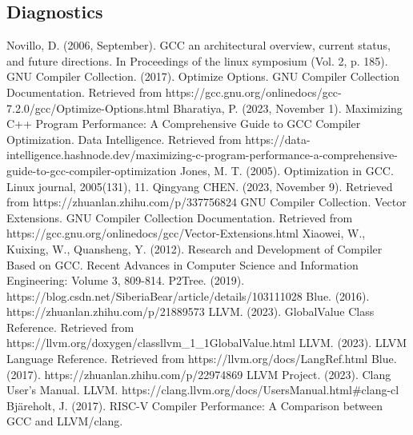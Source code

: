 \documentclass[conference]{IEEEtran}
\begin{document}
\subsection{Diagnostics}



\begin{thebibliography}{00}

	 Novillo, D. (2006, September). GCC an architectural overview, current status, and future directions. In Proceedings of the linux symposium (Vol. 2, p. 185).
	 GNU Compiler Collection. (2017). Optimize Options. GNU Compiler Collection Documentation. Retrieved from https://gcc.gnu.org/onlinedocs/gcc-7.2.0/gcc/Optimize-Options.html
	 Bharatiya, P. (2023, November 1). Maximizing C++ Program Performance: A Comprehensive Guide to GCC Compiler Optimization. Data Intelligence. Retrieved from https://data-intelligence.hashnode.dev/maximizing-c-program-performance-a-comprehensive-guide-to-gcc-compiler-optimization
	 Jones, M. T. (2005). Optimization in GCC. Linux journal, 2005(131), 11.
	 Qingyang CHEN. (2023, November 9). Retrieved from https://zhuanlan.zhihu.com/p/337756824
	 GNU Compiler Collection. Vector Extensions. GNU Compiler Collection Documentation. Retrieved from https://gcc.gnu.org/onlinedocs/gcc/Vector-Extensions.html
	 Xiaowei, W., Kuixing, W., Quansheng, Y. (2012). Research and Development of Compiler Based on GCC. Recent Advances in Computer Science and Information Engineering: Volume 3, 809-814.
	 P2Tree. (2019). https://blog.csdn.net/SiberiaBear/article/details/103111028
	 Blue. (2016). https://zhuanlan.zhihu.com/p/21889573
	 LLVM. (2023). GlobalValue Class Reference. Retrieved from https://llvm.org/doxygen/classllvm\_1\_1GlobalValue.html
	 LLVM. (2023). LLVM Language Reference. Retrieved from https://llvm.org/docs/LangRef.html
	 Blue. (2017). https://zhuanlan.zhihu.com/p/22974869
	 LLVM Project. (2023). Clang User's Manual. LLVM. https://clang.llvm.org/docs/UsersManual.html\#clang-cl
	 Bjäreholt, J. (2017). RISC-V Compiler Performance: A Comparison between GCC and LLVM/clang.


\end{thebibliography}

\vspace{12pt}
\end{document}
